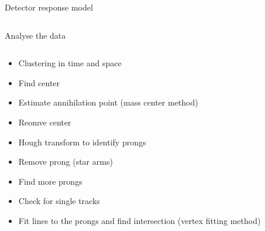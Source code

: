 \documentclass{beamer}
\begin{document}
\begin{frame}{\centering Detector response model}
\begin{columns}
\begin{column}{0.55\textwidth}
    \end{column}
    \end{columns}
\end{frame}



\begin{frame}{\centering Analyse the data}
  \begin{columns}
    \begin{column}{0.5\textwidth}
      \begin{itemize}
      \item<1->{Clustering in time and space}
      \item<2->{Find center}
      \item<3->{Estimate annihilation point (mass center method)}
      \item<4->{Reomve center}
      \item<5->{Hough transform to identify prongs}
      \item<6->{Remove prong (star arms)}
      \item<7->{Find more prongs}
      \item<8->{Check for single tracks}
      \item<11>{Fit lines to the prongs and find intersection (vertex fitting method)}
      \end{itemize}
    \end{column}
    \begin{column}{0.55\textwidth}
\end{column}
\end{columns}
\end{frame}
\end{document}
